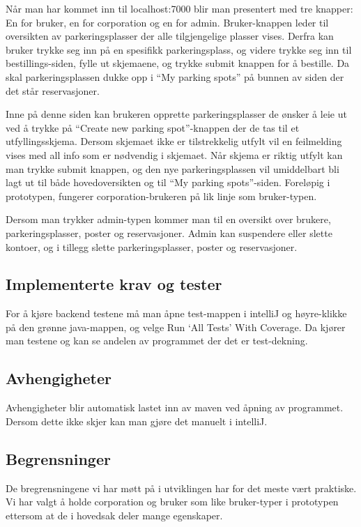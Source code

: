 \documentclass[12pt]{article}
\begin{document}
    Når man har kommet inn til localhost:7000 blir man presentert med tre knapper: En for bruker, en for corporation og en for admin. Bruker-knappen leder til oversikten av parkeringsplasser der alle tilgjengelige plasser vises. Derfra kan bruker trykke seg inn på en spesifikk parkeringsplass, og videre trykke seg inn til bestillings-siden, fylle ut skjemaene, og trykke submit knappen for å bestille. Da skal parkeringsplassen dukke opp i “My parking spots” på bunnen av siden der det står reservasjoner.
    
    Inne på denne siden kan brukeren opprette parkeringsplasser de ønsker å leie ut ved å trykke på “Create new parking spot”-knappen der de tas til et utfyllingsskjema. Dersom skjemaet ikke er tilstrekkelig utfylt vil en feilmelding vises med all info som er nødvendig i skjemaet. Når skjema er riktig utfylt kan man trykke submit knappen, og den nye parkeringsplassen vil umiddelbart bli lagt ut til både hovedoversikten og til “My parking spots”-siden. Foreløpig i prototypen, fungerer corporation-brukeren på lik linje som bruker-typen.
    
    Dersom man trykker admin-typen kommer man til en oversikt over brukere, parkeringsplasser, poster og reservasjoner. Admin kan suspendere eller slette kontoer, og i tillegg slette parkeringsplasser, poster og reservasjoner.

    \subsection{Implementerte krav og tester}
    For å kjøre backend testene må man åpne test-mappen i intelliJ og høyre-klikke på den grønne java-mappen, og velge Run ‘All Tests’ With Coverage. Da kjører man testene og kan se andelen av programmet der det er test-dekning.

    \subsection{Avhengigheter}
    Avhengigheter blir automatisk lastet inn av maven ved åpning av programmet. Dersom dette ikke skjer kan man gjøre det manuelt i intelliJ.

    \subsection{Begrensninger}
    De bregrensningene vi har møtt på i utviklingen har for det meste vært praktiske. Vi har valgt å holde corporation og bruker som like bruker-typer i prototypen ettersom at de i hovedsak deler mange egenskaper.
    
\end{document}
